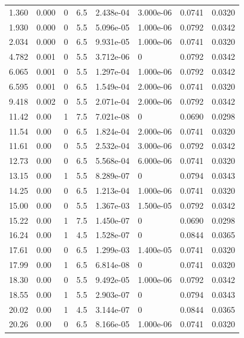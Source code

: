 \documentclass[preview]{standalone}
\begin{document}
{{\begin{tabular}{L{1.2cm}C{1.2cm} C{0.3cm}C{0.5cm} C{1.4cm}C{1.4cm} C{1.4cm}C{1.4cm}}
  1.360  &  0.000  & 0     & 6.5 &  2.438e-04  & 3.000e-06  & 0.0741 &  0.0320   \\ 
  1.930  &  0.000  & 0     & 5.5 &  5.096e-05  & 1.000e-06  & 0.0792 &  0.0342   \\ 
  2.034  &  0.000  & 0     & 6.5 &  9.931e-05  & 1.000e-06  & 0.0741 &  0.0320   \\ 
  4.782  &  0.001  & 0     & 5.5 &  3.712e-06  & 0  & 0.0792 &  0.0342   \\ 
  6.065  &  0.001  & 0     & 5.5 &  1.297e-04  & 1.000e-06  & 0.0792 &  0.0342   \\ 
  6.595  &  0.001  & 0     & 6.5 &  1.549e-04  & 2.000e-06  & 0.0741 &  0.0320   \\ 
  9.418  &  0.002  & 0     & 5.5 &  2.071e-04  & 2.000e-06  & 0.0792 &  0.0342   \\ 
  11.42  &  0.00  & 1     & 7.5 &  7.021e-08  & 0  & 0.0690 &  0.0298   \\ 
  11.54  &  0.00  & 0     & 6.5 &  1.824e-04  & 2.000e-06  & 0.0741 &  0.0320   \\ 
  11.61  &  0.00  & 0     & 5.5 &  2.532e-04  & 3.000e-06  & 0.0792 &  0.0342   \\ 
  12.73  &  0.00  & 0     & 6.5 &  5.568e-04  & 6.000e-06  & 0.0741 &  0.0320   \\ 
  13.15  &  0.00  & 1     & 5.5 &  8.289e-07  & 0  & 0.0794 &  0.0343   \\ 
  14.25  &  0.00  & 0     & 6.5 &  1.213e-04  & 1.000e-06  & 0.0741 &  0.0320   \\ 
  15.00  &  0.00  & 0     & 5.5 &  1.367e-03  & 1.500e-05  & 0.0792 &  0.0342   \\ 
  15.22  &  0.00  & 1     & 7.5 &  1.450e-07  & 0  & 0.0690 &  0.0298   \\ 
  16.24  &  0.00  & 1     & 4.5 &  1.528e-07  & 0  & 0.0844 &  0.0365   \\ 
  17.61  &  0.00  & 0     & 6.5 &  1.299e-03  & 1.400e-05  & 0.0741 &  0.0320   \\ 
  17.99  &  0.00  & 1     & 6.5 &  6.814e-08  & 0  & 0.0741 &  0.0320   \\ 
  18.30  &  0.00  & 0     & 5.5 &  9.492e-05  & 1.000e-06  & 0.0792 &  0.0342   \\ 
  18.55  &  0.00  & 1     & 5.5 &  2.903e-07  & 0  & 0.0794 &  0.0343   \\ 
  20.02  &  0.00  & 1     & 4.5 &  3.144e-07  & 0  & 0.0844 &  0.0365   \\ 
  20.26  &  0.00  & 0     & 6.5 &  8.166e-05  & 1.000e-06  & 0.0741 &  0.0320   \\ 

\end{tabular}}}
\end{document}
